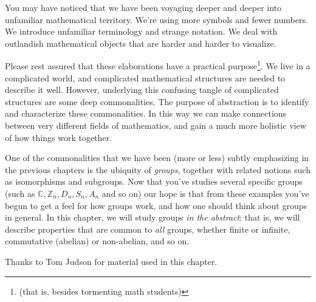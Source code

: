 

You may have noticed that we have been voyaging deeper and deeper into unfamiliar mathematical territory. We're using more symbols and fewer numbers. We introduce unfamiliar terminology and strange notation. We deal with outlandish mathematical objects that are harder and harder to visualize. 

Please rest assured that these elaborations have a practical purpose\footnote{(that is, besides tormenting math students)}. We live in a complicated world, and complicated mathematical structures are needed to describe it well. However, underlying this confusing tangle of complicated structures are some deep commonalities. The purpose of abstraction is to identify and characterize these commonalities. In this way we can make connections between very different fields of mathematics, and gain a much more holistic view of how things work together.
 
One of the commonalities that we have been (more or less) subtly emphasizing in the previous chapters is the ubiquity of \emph{groups}, together with related notions such as isomorphisms and subgroups. Now that you've studies several specific groups (such as ${\mathbb C}, {\mathbb Z}_n, D_n, S_n, A_n$ and so on) our hope is that from these examples you've begun to get a feel for how groups work, and how one should think about groups in general. In this chapter, we will study groups \emph{in the abstract}: that is, we will describe properties that are common to \emph{all} groups, whether finite or infinite, commutative (abelian) or non-abelian, and so on.
\medskip

Thanks to Tom Judson for material used in this chapter.

